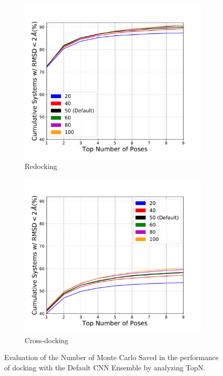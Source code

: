 \documentclass[journal=jcisd8,manuscript=article]{achemso}
\begin{document}
\begin{figure}    
        \begin{subfigure}[b]{0.48\textwidth}    
		\centering
		\includegraphics[width=\textwidth]{figures/redocking/sweep_mcsaved_line.pdf}
		\caption{Redocking}
		\label{fig:mcsaved rd}
        \end{subfigure}    
        \begin{subfigure}[b]{0.48\textwidth}    
		\centering
		\includegraphics[width=\textwidth]{figures/crossdocking/sweep_mcsaved_line.pdf}
		\caption{Cross-docking}
		\label{fig:mcsaved cd}
        \end{subfigure}    
	\caption{Evaluation of the Number of Monte Carlo Saved in the performance of docking with the Default CNN Ensemble by analyzing TopN.}
	\label{fig:mcsaved}
\end{figure}    
\end{document}
